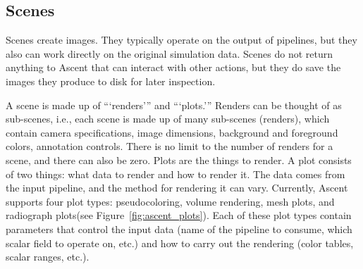 \subsection{Scenes}

Scenes create images.
%
They typically operate on the output of pipelines, but they also can work directly
on the original simulation data.
%
Scenes do not return anything to Ascent that can interact with other actions, but they
do save the images they produce to disk for later inspection.

A scene is made up of ```renders''' and ```plots.'''
%
Renders can be thought of as sub-scenes, i.e., each scene is made up of many sub-scenes (renders),
which contain
camera specifications, image dimensions, background and
foreground colors, annotation controls.
%
There is no limit to the number of renders for a scene, and there can also be zero.
%
Plots are the things to render.
%
A plot consists of two things: what data to render and how to render it.
%
The data comes from the input pipeline, and the method for rendering it can vary.
%
Currently, Ascent supports four plot types: pseudocoloring, volume rendering, mesh plots,
and radiograph plots(see Figure~\ref{fig:ascent_plots}).
%
Each of these plot types contain parameters that control the input data
(name of the pipeline to consume, which scalar field to operate on, etc.)
and how to carry out the rendering (color tables, scalar ranges, etc.).
%

